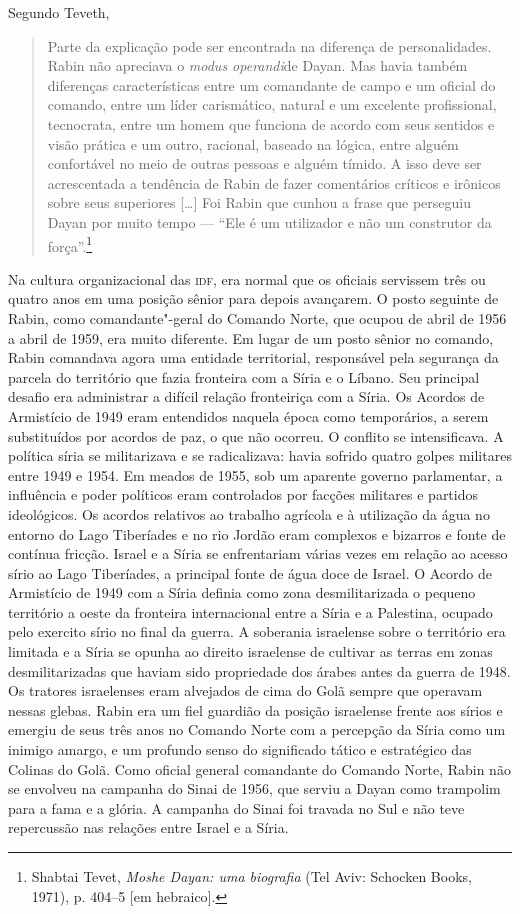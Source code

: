 Segundo Teveth,

\begin{quote}
Parte da explicação pode ser encontrada na diferença de personalidades.
Rabin não apreciava o \emph{modus operandi}de Dayan. Mas havia também
diferenças características entre um comandante de campo e um oficial do
comando, entre um líder carismático, natural e um excelente
profissional, tecnocrata, entre um homem que funciona de acordo com seus
sentidos e visão prática e um outro, racional, baseado na lógica, entre
alguém confortável no meio de outras pessoas e alguém tímido. A isso
deve ser acrescentada a tendência de Rabin de fazer comentários críticos
e irônicos sobre seus superiores {[}\ldots{}{]} Foi Rabin que cunhou a frase
que perseguiu Dayan por muito tempo --- ``Ele é um utilizador e não um
construtor da força''.\footnote{Shabtai Tevet, \emph{Moshe Dayan: uma biografia} (Tel Aviv: Schocken Books,
1971), p. 404--5 {[}em hebraico{]}.}
\end{quote}

Na cultura organizacional das \textsc{idf}, era normal que os oficiais servissem
três ou quatro anos em uma posição sênior para depois avançarem. O posto
seguinte de Rabin, como comandante"-geral do Comando Norte, que ocupou de
abril de 1956 a abril de 1959, era muito diferente. Em lugar de um posto
sênior no comando, Rabin comandava agora uma entidade territorial,
responsável pela segurança da parcela do território que fazia fronteira
com a Síria e o Líbano. Seu principal desafio era administrar a difícil
relação fronteiriça com a Síria. Os Acordos de Armistício de 1949 eram
entendidos naquela época como temporários, a serem substituídos por
acordos de paz, o que não ocorreu. O conflito se intensificava. A
política síria se militarizava e se radicalizava: havia sofrido quatro
golpes militares entre 1949 e 1954. Em meados de 1955, sob um aparente
governo parlamentar, a influência e poder políticos eram controlados por
facções militares e partidos ideológicos. Os acordos relativos ao
trabalho agrícola e à utilização da água no entorno do Lago Tiberíades e
no rio Jordão eram complexos e bizarros e fonte de contínua fricção.
Israel e a Síria se enfrentariam várias vezes em relação ao acesso sírio
ao Lago Tiberíades, a principal fonte de água doce de Israel. O Acordo
de Armistício de 1949 com a Síria definia como zona desmilitarizada o
pequeno território a oeste da fronteira internacional entre a Síria e a
Palestina, ocupado pelo exercito sírio no final da guerra. A soberania
israelense sobre o território era limitada e a Síria se opunha ao
direito israelense de cultivar as terras em zonas desmilitarizadas que
haviam sido propriedade dos árabes antes da guerra de 1948. Os tratores
israelenses eram alvejados de cima do Golã sempre que operavam
nessas glebas. Rabin era um fiel guardião da posição israelense frente
aos sírios e emergiu de seus três anos no Comando Norte com a percepção
da Síria como um inimigo amargo, e um profundo senso do significado
tático e estratégico das Colinas do Golã. Como oficial general
comandante do Comando Norte, Rabin não se envolveu na campanha do Sinai
de 1956, que serviu a Dayan como trampolim para a fama e a glória. A
campanha do Sinai foi travada no Sul e não teve repercussão nas relações
entre Israel e a Síria.

